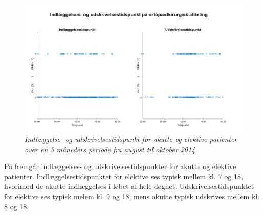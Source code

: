 \begin{figure}[H]
	\flushleft 
	\centering
	\includegraphics[scale=0.5]{figures/indlaegudskriv.png}
	\flushleft
	\caption{\textit{Indlæggelse- og udskrivelsestidspunkt for akutte og elektive patienter over en 3 måneders periode fra august til oktober 2014.}}
	\label{indlaegudskriv}
	\end{figure}
	
\noindent
På  fremgår indlæggelses- og udskrivelsestidspunkter for akutte og elektive patienter. Indlæggelsestidspunktet for elektive ses typisk mellem kl. 7 og 18, hvorimod de akutte indlæggelses i løbet af hele døgnet. Udskrivelsestidspunktet for elektive ses typisk melem kl. 9 og 18, mens akutte typisk udskrives mellem kl. 8 og 18. 